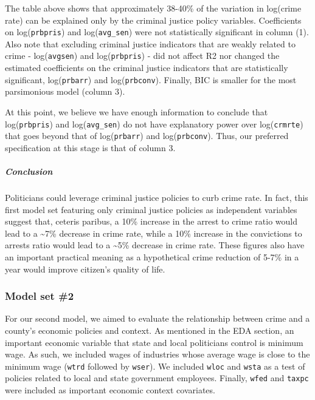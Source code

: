 \documentclass[]{article}
\let\oldsubparagraph\subparagraph
\renewcommand{\subparagraph}[1]{\oldsubparagraph{#1}\mbox{}}
\begin{document}
The table above shows that approximately 38-40\% of the variation in
log(crime rate) can be explained only by the criminal justice policy
variables. Coefficients on log(\texttt{prbpris}) and
log(\texttt{avg\_sen}) were not statistically significant in column (1).
Also note that excluding criminal justice indicators that are weakly
related to crime - log(\texttt{avgsen}) and log(\texttt{prbpris}) - did
not affect R2 nor changed the estimated coefficients on the criminal
justice indicators that are statistically significant,
log(\texttt{prbarr}) and log(\texttt{prbconv}). Finally, BIC is smaller
for the most parsimonious model (column 3).

At this point, we believe we have enough information to conclude that
log(\texttt{prbpris}) and log(\texttt{avg\_sen}) do not have explanatory
power over log(\texttt{crmrte}) that goes beyond that of
log(\texttt{prbarr}) and log(\texttt{prbconv}). Thus, our preferred
specification at this stage is that of column 3.

\hypertarget{conclusion}{%
\subparagraph{Conclusion}\label{conclusion}}

Politicians could leverage criminal justice policies to curb crime rate.
In fact, this first model set featuring only criminal justice policies
as independent variables suggest that, ceteris paribus, a 10\% increase
in the arrest to crime ratio would lead to a \textasciitilde{}7\%
decrease in crime rate, while a 10\% increase in the convictions to
arrests ratio would lead to a \textasciitilde{}5\% decrease in crime
rate. These figures also have an important practical meaning as a
hypothetical crime reduction of 5-7\% in a year would improve citizen's
quality of life.

\hypertarget{model-set-2}{%
\subsubsection{Model set \#2}\label{model-set-2}}

For our second model, we aimed to evaluate the relationship between
crime and a county's economic policies and context. As mentioned in the
EDA section, an important economic variable that state and local
politicians control is minimum wage. As such, we included wages of
industries whose average wage is close to the minimum wage
(\texttt{wtrd} followed by \texttt{wser}). We included \texttt{wloc} and
\texttt{wsta} as a test of policies related to local and state
government employees. Finally, \texttt{wfed} and \texttt{taxpc} were
included as important economic context covariates.
\end{document}
